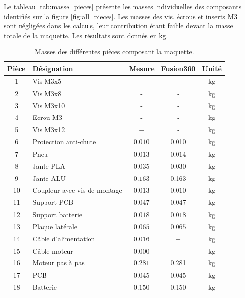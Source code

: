 Le tableau \ref{tab:masse_pieces} présente les masses individuelles des composants identifiés sur la figure \ref{fig:all_pieces}. Les masses des vis, écrous et inserts M3 sont négligées dans les calculs, leur contribution étant faible devant la masse totale de la maquette.
Les résultats sont donnés en \si{\kilogram}.
\begin{table}[H]
\centering
\begin{tabular}{|c|p{6cm}|c|c|c|}
\hline
\textbf{Pièce} & \textbf{Désignation} & \textbf{Mesure} & \textbf{Fusion360} & \textbf{Unité} \\
\hline
1 & Vis M3x5 & - & - & \si{\kilogram} \\
\hline
2 & Vis M3x8 & - & - & \si{\kilogram} \\
\hline
3 & Vis M3x10 & - & - & \si{\kilogram} \\
\hline
4 & Ecrou M3 & - & - & \si{\kilogram} \\
\hline
5 & Vis M3x12 & $-$ &- & \si{\kilogram} \\
\hline
6 & Protection anti-chute & $0.010$ & 0.010 & \si{\kilogram} \\
\hline
7 & Pneu & $0.013$ & $0.014$ & \si{\kilogram} \\
\hline
8 & Jante PLA & $0.035$ & $0.030$ & \si{\kilogram} \\
\hline
9 & Jante ALU & $0.163$ & 0.163& \si{\kilogram} \\
\hline
10 & Coupleur avec vis de montage & $0.013$ & $0.010$ & \si{\kilogram} \\
\hline
11 & Support PCB & $0.047$ & $0.047$ & \si{\kilogram} \\
\hline 
12 & Support batterie& $0.018$ & $0.018$ & \si{\kilogram} \\
\hline
13 & Plaque latérale & $0.065$ & $0.065$ & \si{\kilogram} \\
\hline
14 & Câble d'alimentation & $0.016$ & $-$ & \si{\kilogram} \\
\hline
15 & Câble moteur & $0.000$ & $-$ & \si{\kilogram} \\
\hline
16 & Moteur pas à pas & $0.281$ & 0.281 & \si{\kilogram} \\
\hline
17 & PCB & $0.045$ & 0.045& \si{\kilogram} \\
\hline
18 & Batterie & $0.150$ & 0.150 & \si{\kilogram} \\
\hline
\end{tabular}
\caption{Masses des différentes pièces composant la maquette.}
\end{table}
\label{tab:masse_pieces}

